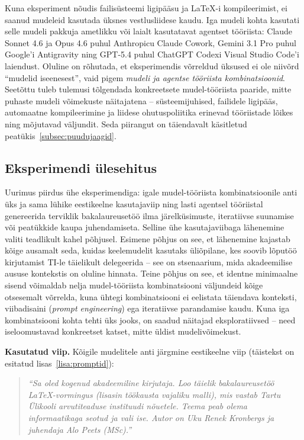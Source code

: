 Kuna eksperiment nõudis failisüsteemi ligipääsu ja \LaTeX{}-i kompileerimist, ei saanud mudeleid kasutada üksnes vestlusliidese kaudu. Iga mudeli kohta kasutati selle mudeli pakkuja ametlikku või laialt kasutatavat agentset tööriista: Claude Sonnet 4.6 ja Opus 4.6 puhul Anthropicu Claude Cowork, Gemini 3.1 Pro puhul Google'i Antigravity ning GPT-5.4 puhul ChatGPT Codexi Visual Studio Code'i laiendust. Oluline on rõhutada, et eksperimendis võrreldud üksused ei ole niivõrd ``mudelid iseenesest'', vaid pigem \emph{mudeli ja agentse tööriista kombinatsioonid}. Seetõttu tuleb tulemusi tõlgendada konkreetsete mudel-tööriista paaride, mitte puhaste mudeli võimekuste näitajatena -- süsteemijuhised, failidele ligipääs, automaatne kompileerimine ja liidese ohutuspoliitika erinevad tööriistade lõikes ning mõjutavad väljundit. Seda piirangut on täiendavalt käsitletud peatükis~\ref{subsec:puudujaagid}.

\subsection{Eksperimendi ülesehitus} \label{subsec:eksperimendi-ulesehitus}

Uurimus piirdus ühe eksperimendiga: igale mudel-tööriista kombinatsioonile anti üks ja sama lühike eestikeelne kasutajaviip ning lasti agentsel tööriistal genereerida terviklik bakalaureusetöö ilma järelküsimuste, iteratiivse suunamise või peatükkide kaupa juhendamiseta. Selline ühe kasutajaviibaga lähenemine valiti teadlikult kahel põhjusel. Esimene põhjus on see, et lähenemine kajastab kõige ausamalt seda, kuidas keelemudelit kasutaks üliõpilane, kes soovib lõputöö kirjutamist TI-le täielikult delegeerida -- see on stsenaarium, mida akadeemilise aususe kontekstis on oluline hinnata. Teine põhjus on see, et identne minimaalne sisend võimaldab nelja mudel-tööriista kombinatsiooni väljundeid kõige otsesemalt võrrelda, kuna ühtegi kombinatsiooni ei eelistata täiendava konteksti, viibadisaini (\textit{prompt engineering}) ega iteratiivse parandamise kaudu. Kuna iga kombinatsiooni kohta tehti üks jooks, on saadud näitajad eksploratiivsed -- need iseloomustavad konkreetset katset, mitte üldist mudelivõimekust.

\textbf{Kasutatud viip.} Kõigile mudelitele anti järgmine eestikeelne viip (täistekst on esitatud lisas~\ref{lisa:promptid}):

\begin{quote}
\textit{``Sa oled kogenud akadeemiline kirjutaja. Loo täielik bakalaureusetöö LaTeX-vormingus (lisasin töökausta vajaliku malli), mis vastab Tartu Ülikooli arvutiteaduse instituudi nõuetele. Teema peab olema informaatikaga seotud ja vali ise. Autor on Uku Renek Kronbergs ja juhendaja Alo Peets (MSc).''}
\end{quote}

